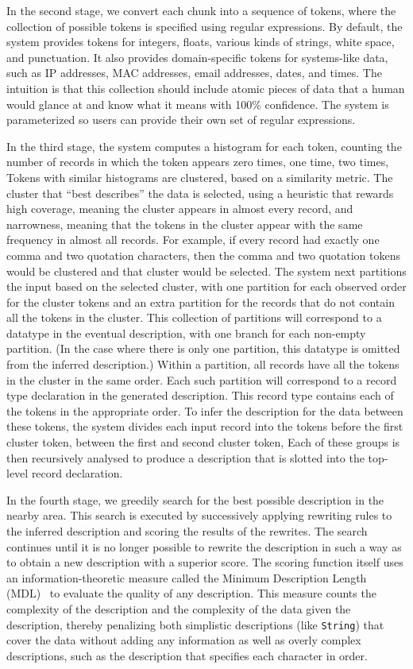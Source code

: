 \documentclass{sig-alternate}
\begin{document}
In the second stage, we convert each chunk into a sequence of tokens,
where the collection of possible tokens is specified using regular
expressions.  By default, the system provides tokens for integers,
floats, various kinds of strings, white space, and punctuation.  It
also provides domain-specific tokens for systems-like data, such as IP
addresses, MAC addresses, email addresses, dates, and times.  The
intuition is that this collection should include atomic pieces of data
that a human would glance at and know what it means with 100\%
confidence.   The system is parameterized so users can provide their
own set of regular expressions. 

In the third stage, the system computes a histogram for each token,
counting the number of records in which the token appears zero times,
one time, two times, \etc{}  Tokens with similar histograms are
clustered, based on a similarity metric.  The cluster that ``best
describes'' the data is selected, using a heuristic that rewards high
coverage, meaning the cluster appears in almost every record, and
narrowness, meaning that the tokens in the cluster appear with the
same frequency in almost all records.  For example, if every record
had exactly one comma and two quotation characters, then the comma and
two quotation tokens would be clustered and that cluster would be
selected.  The system next partitions the input based on the selected
cluster, with one partition for each observed order for the cluster
tokens and an extra partition for the records that do not contain all
the tokens in the cluster.  This collection of partitions will
correspond to a datatype in the eventual description, with one branch
for each non-empty partition.  (In the case where there is only one
partition, this datatype is omitted from the inferred description.)
Within a partition, all records have all the tokens in the cluster in
the same order.  Each such partition will correspond to a record type
declaration in the generated description. This record type contains
each of the tokens in the appropriate order.  To infer the description
for the data between these tokens, the system divides each input
record into the tokens before the first cluster token, between the
first and second cluster token, \etc{} Each of these groups is then
recursively analysed to produce a description that is slotted into the
top-level record declaration.

In the fourth stage, we greedily search for the best possible description
in the nearby area.
This search is executed by successively applying rewriting 
rules to the inferred description and scoring the results of the
rewrites.  The search continues until it is no longer possible to
rewrite the description in such a way as to obtain a new description
with a superior score.  The scoring function itself
uses an information-theoretic measure called
the Minimum Description Length (MDL)~\cite{mdlbook} to evaluate the
quality of any description.  This measure counts the complexity of the description
and the complexity of the data given the description, thereby
penalizing both simplistic descriptions (like \texttt{String}) that
cover the data without adding any information as well as overly
complex descriptions, such as the description that specifies each
character in order.  
\end{document}
